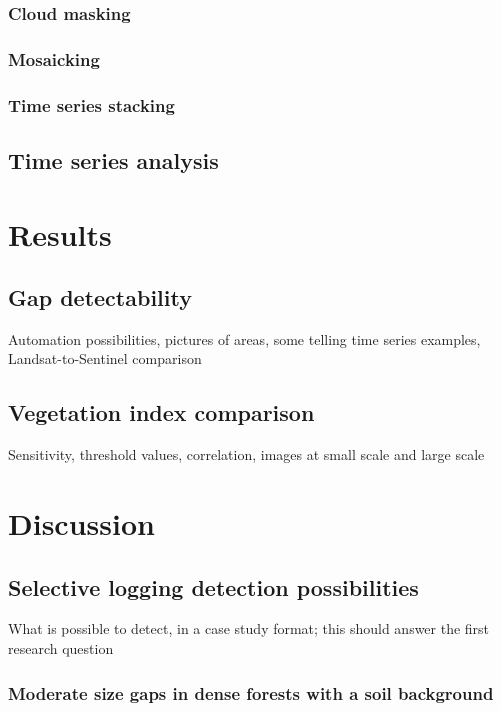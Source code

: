 \documentclass[a4paper,12pt]{scrbook}
\begin{document}
\subsection{Cloud masking}

\subsection{Mosaicking}

\subsection{Time series stacking}

\section{Time series analysis}

\chapter{Results}

\section{Gap detectability}

Automation possibilities, pictures of areas, some telling time series examples, Landsat-to-Sentinel comparison

\section{Vegetation index comparison}

Sensitivity, threshold values, correlation, images at small scale and large scale

\chapter{Discussion}

\section{Selective logging detection possibilities}

What is possible to detect, in a case study format; this should answer the first research question

\subsection{Moderate size gaps in dense forests with a soil background}
\end{document}
